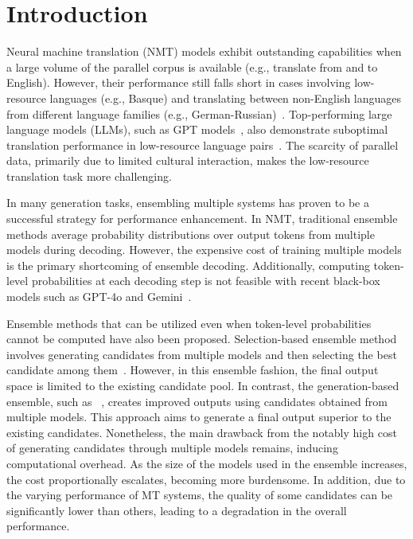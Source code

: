 \section{Introduction}


Neural machine translation (NMT) models exhibit outstanding capabilities when a large volume of the parallel corpus is available (e.g., translate from and to English).
However, their performance still falls short in cases involving low-resource languages (e.g., Basque) and translating between non-English languages from different language families (e.g., German-Russian)~\cite{artetxe2018unsupervised}.
Top-performing large language models (LLMs), such as GPT models~\cite{gpt3.5}, also demonstrate suboptimal translation performance in low-resource language pairs~\cite{robinson-etal-2023-chatgpt, moslem-etal-2023-adaptive}. 
The scarcity of parallel data, primarily due to limited cultural interaction, makes the low-resource translation task more challenging.


In many generation tasks, ensembling multiple systems has proven to be a successful strategy for performance enhancement.
In NMT, traditional ensemble methods average probability distributions over output tokens from multiple models during decoding.
However, the expensive cost of training multiple models is the primary shortcoming of ensemble decoding.
Additionally, computing token-level probabilities at each decoding step is not feasible with recent black-box models such as GPT-4o and Gemini~\cite{gpt4o, geminiteam2023gemini}.


Ensemble methods that can be utilized even when token-level probabilities cannot be computed have also been proposed.
Selection-based ensemble method involves generating candidates from multiple models and then selecting the best candidate among them~\cite{wang2022rationaleaugmented, howgood}.
However, in this ensemble fashion, the final output space is limited to the existing candidate pool.
In contrast, the generation-based ensemble, such as \blender~\cite{llm-blender}, creates improved outputs using candidates obtained from multiple models.
This approach aims to generate a final output superior to the existing candidates.
Nonetheless, the main drawback from the notably high cost of generating candidates through multiple models remains, inducing computational overhead.
As the size of the models used in the ensemble increases, the cost proportionally escalates, becoming more burdensome.
In addition, due to the varying performance of MT systems, the quality of some candidates can be significantly lower than others, leading to a degradation in the overall performance.


